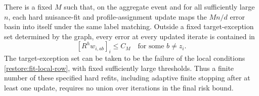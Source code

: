 \begin{lemma}
\label{restore:fit-invariant-basin}
\label{restore:fit-invariant}
There is a fixed $M$ such that, on the aggregate event and for all
sufficiently large $n$, each hard nuisance-fit and profile-assignment
update maps the $Mn/d$ error basin into itself under the same label
matching. Outside a fixed target-exception set determined by the graph,
every error at every updated iterate is contained in
\[
 [R^h w_{i,ab}]_i\le C_M
 \quad\text{for some }b\ne z_i.
\]
The target-exception set can be taken to be the failure of the local
conditions \eqref{restore:fit-local-row}, with fixed sufficiently large
thresholds. Thus a finite number of these specified hard refits, including
adaptive finite stopping after at least one update, requires no union
over iterations in the final risk bound.
\end{lemma}

